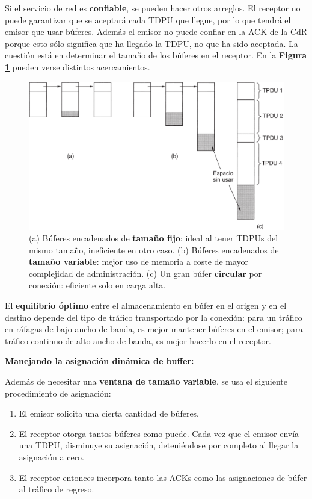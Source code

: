 \documentclass[10pt,a4paper]{article}
\begin{document}
Si el servicio de red es \textbf{confiable}, se pueden hacer otros arreglos. El receptor no puede garantizar que se aceptará cada TDPU que llegue, por lo que tendrá el emisor que usar búferes. Además el emisor no puede confiar en la ACK de la CdR porque esto sólo significa que ha llegado la TDPU, no que ha sido aceptada. La cuestión está en determinar el tamaño de los búferes en el receptor. En la \textbf{Figura \ref{fig:buferes_dinamicos}} pueden verse distintos acercamientos.

\begin{figure}[ht!]
  \caption{(a) Búferes encadenados de \textbf{tamaño fijo}: ideal al tener TDPUs del mismo tamaño, ineficiente en otro caso. (b) Búferes encadenados de \textbf{tamaño variable}: mejor uso de memoria a coste de mayor complejidad de administración. (c) Un gran búfer \textbf{circular} por conexión: eficiente solo en carga alta.}
  \label{fig:buferes_dinamicos}
  \centerline{\includegraphics[width=\textwidth-\fboxrule-\fboxrule]{imgs/buferes_dinamicos.png}}
\end{figure}

El \textbf{equilibrio óptimo} entre el almacenamiento en búfer en el origen y en el destino depende del tipo de tráfico transportado por la conexión: para un tráfico en ráfagas de bajo ancho de banda, es mejor mantener búferes en el emisor; para tráfico continuo de alto ancho de banda, es mejor hacerlo en el receptor.

\underline{\textbf{Manejando la asignación dinámica de buffer:}}

Además de necesitar una \textbf{ventana de tamaño variable}, se usa el siguiente procedimiento de asignación:
\begin{enumerate}
\item El emisor solicita una cierta cantidad de búferes.
\item El receptor otorga tantos búferes como puede. Cada vez que el emisor envía una TDPU, disminuye su asignación, deteniéndose por completo al llegar la asignación a cero.
\item El receptor entonces incorpora tanto las ACKs como las asignaciones de búfer al tráfico de regreso.
\end{enumerate}
\end{document}
